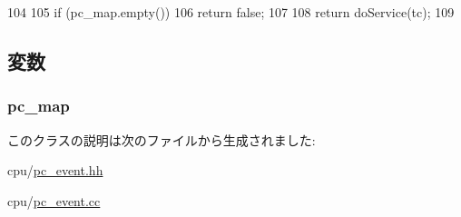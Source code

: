 \begin{DoxyCode}
104     {
105         if (pc_map.empty())
106             return false;
107 
108         return doService(tc);
109     }
\end{DoxyCode}


\subsection{変数}
\hypertarget{classPCEventQueue_a2e55562092a0fea15421a9591ea20223}{
\subsubsection[{pc\_\-map}]{ {\bf pc\_\-map}}}
\label{classPCEventQueue_a2e55562092a0fea15421a9591ea20223}


このクラスの説明は次のファイルから生成されました:\begin{DoxyCompactItemize}
\item 
cpu/\hyperlink{pc__event_8hh}{pc\_\-event.hh}\item 
cpu/\hyperlink{pc__event_8cc}{pc\_\-event.cc}\end{DoxyCompactItemize}
